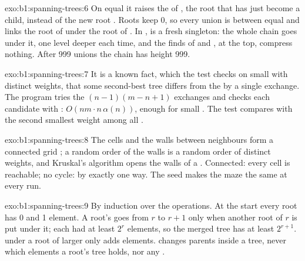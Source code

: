 \begin{solution}{exo:b1:spanning-trees:6}
On equal  it raises the  of , the root that has just become a child, instead of the new root .
Roots keep  0, so every union is between equal  and links the root of  under the root of . In
,  is a fresh singleton: the whole chain goes under it, one level deeper each time, and
the finds of  and , at the top, compress nothing. After 999 unions the chain has height 999.
\end{solution}

\begin{solution}{exo:b1:spanning-trees:7}
It is a known fact, which the test checks on small  with distinct weights, that some second-best tree differs from
the  by a single exchange. The program tries the $(n - 1)(m - n + 1)$ exchanges and checks each
candidate with : $O(n m \cdot n\, \alpha(n))$, enough for small . The test compares with the second
smallest weight among all .
\end{solution}

\begin{solution}{exo:b1:spanning-trees:8}
The cells and the walls between neighbours form a connected grid ; a random order of the walls is a random order of
distinct weights, and Kruskal's algorithm opens the walls of a . Connected: every cell is reachable; no
cycle: by exactly one way. The seed makes the maze the same at every run.
\end{solution}

\begin{solution}{exo:b1:spanning-trees:9}
By induction over the operations. At the start every root has  0 and 1 element. A root's  goes from $r$ to $r +
1$ only when another root of  $r$ is put under it; each had at least $2^r$ elements, so the merged tree has at least
$2^{r+1}$.  under a root of larger  only adds elements.  changes parents inside a tree,
never which elements a root's tree holds, nor any .
\end{solution}

